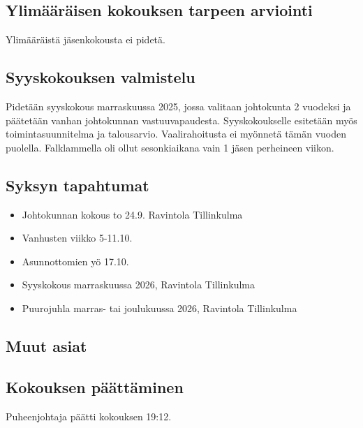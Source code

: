 \documentclass[a4paper,12pt]{article}
\begin{document}
\subsection{Ylimääräisen kokouksen tarpeen arviointi}
Ylimääräistä jäsenkokousta ei pidetä.
\subsection{Syyskokouksen valmistelu}
Pidetään syyskokous marraskuussa 2025, jossa valitaan johtokunta 2 vuodeksi ja päätetään vanhan johtokunnan vastuuvapaudesta. Syyskokoukselle esitetään myös toimintasuunnitelma ja talousarvio. Vaalirahoitusta ei myönnetä tämän vuoden puolella. Falklammella oli ollut sesonkiaikana vain 1 jäsen perheineen viikon.
\subsection{Syksyn tapahtumat}
\begin{itemize}
\item{Johtokunnan kokous} to 24.9. Ravintola Tillinkulma
\item{Vanhusten viikko} 5-11.10.
\item{Asunnottomien yö} 17.10.
\item{Syyskokous} marraskuussa 2026, Ravintola Tillinkulma
\item{Puurojuhla} marras- tai joulukuussa 2026, Ravintola Tillinkulma
\end{itemize}
\subsection{Muut asiat}
\subsection{Kokouksen päättäminen}
Puheenjohtaja päätti kokouksen 19:12.
\end{document}

